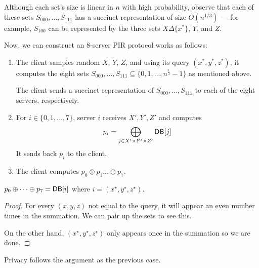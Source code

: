 Although each set's size is linear in $n$ with high probability, 
observe that each of these sets $S_{000}, \ldots, S_{111}$
has a succinct representation 
of size $O(n^{1/3})$ --- for example,
$S_{100}$ can be represented
by the three sets $X \Delta \{x^*\}$, $Y$, and $Z$.

Now, we can construct an $8$-server PIR protocol works as follows:

\begin{enumerate}
\item 
The client samples random $X$, $Y$, $Z$, 
and using its query $(x^*, y^*, z^*)$, it 
computes the 
eight sets $S_{000}, \ldots, S_{111} \subseteq \{0, 1, \ldots, 
n^{\frac13}-1\}$ as mentioned above.

The client sends 
a succinct representation of 
$S_{000}, \ldots, S_{111}$ to each of the eight 
servers, respectively.
\item 
For $i\in \{0, 1, \ldots, 7\}$, server $i$ 
receives $X', Y', Z'$
and computes 
\[p_{i} = \bigoplus_{j \in X' \times Y' \times Z'} {\sf DB}[j]\]
It sends back $p_i$ to the client.
\item 
The client computes $p_0 \oplus p_1 \ldots \oplus p_7$.
\end{enumerate}




\begin{claim} 
$p_0 \oplus \dots \oplus p_7 = {\sf DB}[i]$ 
where 
$i = (x^\star, y^\star, z^\star)$.
\end{claim}
		\begin{proof}
		For every $(x,y,z)$ not equal to the query, it will appear an even number times in the summation. We can pair up the sets to see this. 

		On the other hand, $(x^\star, y^\star, z^\star)$ only appears once in the summation so we are done.
		\end{proof}

		Privacy follows the argument as the previous case. 

